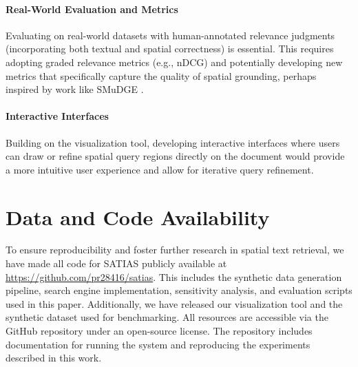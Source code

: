 \documentclass[manuscript,screen]{acmart}
\begin{document}
\paragraph{Real-World Evaluation and Metrics}
Evaluating on real-world datasets with human-annotated relevance judgments (incorporating both textual and spatial correctness) is essential. This requires adopting graded relevance metrics (e.g., nDCG) and potentially developing new metrics that specifically capture the quality of spatial grounding, perhaps inspired by work like SMuDGE \cite{Nguyen25}.

\paragraph{Interactive Interfaces}
Building on the visualization tool, developing interactive interfaces where users can draw or refine spatial query regions directly on the document would provide a more intuitive user experience and allow for iterative query refinement.

\section{Data and Code Availability}
To ensure reproducibility and foster further research in spatial text retrieval, we have made all code for SATIAS publicly available at \url{https://github.com/pr28416/satias}. This includes the synthetic data generation pipeline, search engine implementation, sensitivity analysis, and evaluation scripts used in this paper. Additionally, we have released our visualization tool and the synthetic dataset used for benchmarking. All resources are accessible via the GitHub repository under an open-source license. The repository includes documentation for running the system and reproducing the experiments described in this work.

\begin{acks}

\end{acks}



\end{document}
